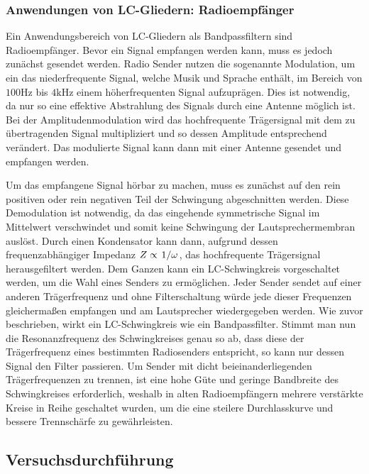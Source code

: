 \subsubsection*{Anwendungen von LC-Gliedern: Radioempfänger}

Ein Anwendungsbereich von LC-Gliedern als Bandpassfiltern sind Radioempfänger. Bevor ein Signal empfangen werden kann, muss es jedoch zunächst gesendet werden. Radio Sender nutzen die sogenannte Modulation, um ein das niederfrequente Signal, welche Musik und Sprache enthält, im Bereich von $100 \si{\hertz}$ bis $4 \si{\kilo\hertz}$ einem höherfrequenten Signal aufzuprägen. Dies ist notwendig, da nur so eine effektive Abstrahlung des Signals durch eine Antenne möglich ist. Bei der Amplitudenmodulation wird das hochfrequente Trägersignal mit dem zu übertragenden Signal multipliziert und so dessen Amplitude entsprechend verändert. Das modulierte Signal kann dann mit einer Antenne gesendet und empfangen werden. 

Um das empfangene Signal hörbar zu machen, muss es zunächst auf den rein positiven oder rein negativen Teil der Schwingung abgeschnitten werden. Diese Demodulation ist notwendig, da das eingehende symmetrische Signal im Mittelwert verschwindet und somit keine Schwingung der Lautsprechermembran auslöst. Durch einen Kondensator kann dann, aufgrund dessen frequenzabhängiger Impedanz $Z \propto \ffrac{1}{\omega}$, das hochfrequente Trägersignal herausgefiltert werden. Dem Ganzen kann ein LC-Schwingkreis vorgeschaltet werden, um die Wahl eines Senders zu ermöglichen. Jeder Sender sendet auf einer anderen Trägerfrequenz und ohne Filterschaltung würde jede dieser Frequenzen gleichermaßen empfangen und am Lautsprecher wiedergegeben werden. Wie zuvor beschrieben, wirkt ein LC-Schwingkreis wie ein Bandpassfilter. Stimmt man nun die Resonanzfrequenz des Schwingkreises genau so ab, dass diese der Trägerfrequenz eines bestimmten Radiosenders entspricht, so kann nur dessen Signal den Filter passieren. Um Sender mit dicht beieinanderliegenden Trägerfrequenzen zu trennen, ist eine hohe Güte und geringe Bandbreite des Schwingkreises erforderlich, weshalb in alten Radioempfängern mehrere verstärkte Kreise in Reihe geschaltet wurden, um die eine steilere Durchlasskurve und bessere Trennschärfe zu gewährleisten.

\subsection{Versuchsdurchführung}

